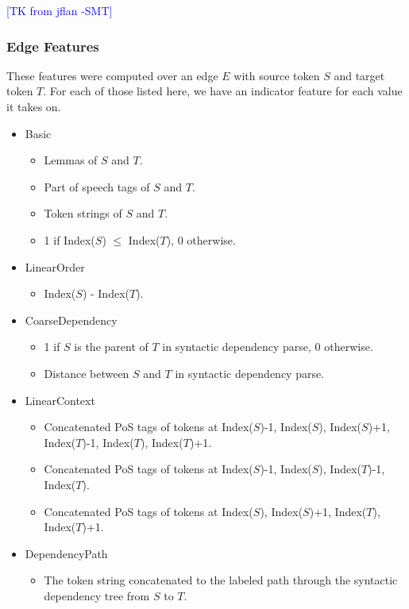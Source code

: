\documentclass[11pt]{article}
\newcommand{\sam}[1]{\textcolor{blue}{[#1 -SMT]}}
\begin{document}
\sam{TK from jflan}


\subsubsection{Edge Features}

\label{s:features}
These features were computed over an edge $E$ with source token $S$ and target token $T$.  For each of those listed here, we have an indicator feature for each value it takes on. 

\begin{itemize}
\item Basic
\begin{itemize}
\item Lemmas of $S$ and $T$.
\item Part of speech tags of $S$ and $T$.
\item Token strings of $S$ and $T$.
\item 1 if Index($S$) $\le$ Index($T$), 0 otherwise.
\end{itemize}
\item LinearOrder
\begin{itemize}
\item Index($S$) - Index($T$).
\end{itemize}
\item CoarseDependency
\begin{itemize}
\item 1 if $S$ is the parent of $T$ in syntactic dependency parse, 0 otherwise.
\item Distance between $S$ and $T$ in syntactic dependency parse.
\end{itemize}
\item LinearContext
\begin{itemize}
\item Concatenated PoS tags of tokens at Index($S$)-1, Index($S$), Index($S$)+1, Index($T$)-1, Index($T$), Index($T$)+1.
\item Concatenated PoS tags of tokens at Index($S$)-1, Index($S$), Index($T$)-1, Index($T$).
\item Concatenated PoS tags of tokens at Index($S$), Index($S$)+1, Index($T$), Index($T$)+1.
\end{itemize}
\item DependencyPath
\begin{itemize}
\item The token string concatenated to the labeled path through the syntactic dependency tree from $S$ to $T$.
\end{itemize}

\end{itemize}
\end{document}
